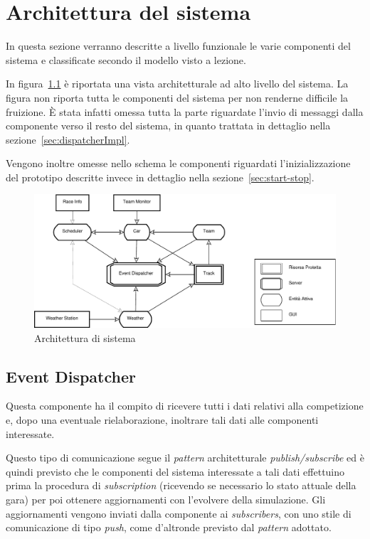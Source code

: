 \chapter{Architettura del sistema}
In questa sezione verranno descritte a livello funzionale le varie componenti del sistema e classificate secondo il modello visto a lezione.

In figura~\ref{fig:architettura} è riportata una vista architetturale ad alto livello del sistema. La figura non riporta tutta le componenti del sistema per non renderne difficile la fruizione. \`E stata infatti omessa tutta la parte riguardate l'invio di messaggi dalla componente \evdisp{} verso il resto del sistema, in quanto trattata in dettaglio nella sezione~\ref{sec:dispatcherImpl}.

Vengono inoltre omesse nello schema le componenti riguardati l'inizializzazione del prototipo descritte invece in dettaglio nella sezione~\ref{sec:start-stop}.
\begin{landscape}
\begin{figure}
\includegraphics[height=.33\paperheight]{diagrammi/Arch}
\caption{Architettura di sistema}
\label{fig:architettura}
\end{figure}
\end{landscape}

\section{Event Dispatcher}
\label{sec:dispatcherArch}
Questa componente ha il compito di ricevere tutti i dati relativi alla competizione e, dopo una eventuale rielaborazione, inoltrare tali dati alle componenti interessate.

Questo tipo di comunicazione segue il \textit{pattern} architetturale \textit{publish/subscribe} ed è quindi previsto che le componenti del sistema interessate a tali dati effettuino prima la procedura di \textit{subscription} (ricevendo se necessario lo stato attuale della gara) per poi ottenere aggiornamenti con l'evolvere della simulazione. Gli aggiornamenti vengono inviati dalla componente \evdisp{} ai \textit{subscribers}, con uno stile di comunicazione di tipo \textit{push}, come d'altronde previsto dal \textit{pattern} adottato.

